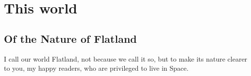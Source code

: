 \documentclass[edeposit,fullpage]{uiucthesis2009}
\begin{document}



%

\mainmatter
\chapter{This world}
\section{Of the Nature of Flatland}

I call our world Flatland, not because we call it so, but to make its
nature clearer to you, my happy readers, who are privileged to live in
Space.


%

\backmatter


\end{document}
